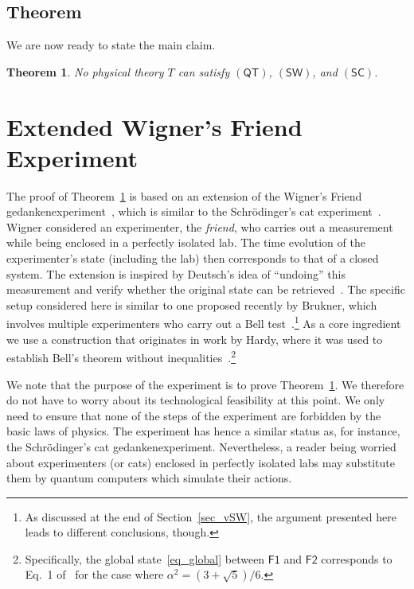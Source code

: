 \documentclass{article}
\theoremstyle{plain}
\newtheorem{theorem}{Theorem}
\theoremstyle{definition}
\newcommand*{\Friendone}{\mathsf{F1}}
\newcommand*{\Friendtwo}{\mathsf{F2}}
\newcommand*{\QT}{\mathsf{(QT)}}
\newcommand*{\SW}{\mathsf{(SW)}}
\newcommand*{\SelfCons}{\mathsf{(SC)}}
\begin{document}
\subsection{Theorem}

We are now ready to state the main claim. 

\begin{shaded}
\begin{theorem} \label{thm_main}
  No physical theory $T$ can satisfy $\QT$, $\SW$, and $\SelfCons$. 
\end{theorem}
\end{shaded}


\section{Extended Wigner's Friend Experiment} \label{sec_experiment}

The proof of Theorem~\ref{thm_main} is based on an extension of the Wigner's Friend gedan\-ken\-ex\-peri\-ment~\cite{Wigner67}, which is similar to the Schr\"odinger's cat experiment~\cite{Schroedinger35}. Wigner considered an experimenter, the \emph{friend}, who carries out a measurement while being enclosed in a perfectly isolated lab. The time evolution of the experimenter's state (including the lab) then corresponds to that of a closed system. The extension is inspired by Deutsch's idea of ``undoing'' this measurement and verify whether the original state can be retrieved~\cite{Deutsch85}. The specific setup considered here is similar to one proposed recently by Brukner, which involves multiple experimenters who carry out a Bell test~\cite{Brukner15}.\footnote{As discussed at the end of Section~\ref{sec_vSW}, the argument presented here leads to different conclusions, though.}  As a  core ingredient we use a construction that originates in work by Hardy, where it was used to establish Bell's theorem without inequalities~\cite{Hardy92,Hardy93}.\footnote{Specifically, the global state~\eqref{eq_global} between $\Friendone$ and $\Friendtwo$ corresponds to Eq.~1 of~\cite{Hardy93} for the case where $\alpha^2 =  (3 + \sqrt{5})/6$.}  

We note that the purpose of the experiment is to prove Theorem~\ref{thm_main}. We therefore do not have to worry about its technological feasibility at this point. We only need to ensure that none of the steps of the experiment are forbidden by the basic laws of physics. The experiment has hence a similar status as, for instance, the Schr\"odinger's cat gedankenexperiment. Nevertheless, a reader being worried about experimenters (or cats) enclosed in perfectly isolated labs may substitute them by quantum computers which simulate their actions. 
\end{document}
